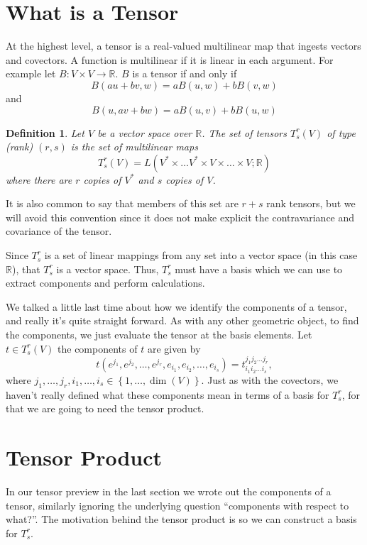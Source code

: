 \documentclass[a4paper]{article}
\newtheorem*{defn}{Definition}
\begin{document}
\section*{What is a Tensor}%
At the highest level, a tensor is a real-valued multilinear map that ingests vectors and covectors. A function is multilinear if it is linear in each argument. For example let $B: V \times V \rightarrow \mathds{R}$. $B$ is a tensor if and only if
\[
  B(au + bv, w) = aB(u,w) + bB(v,w)
\]
and
\[
  B(u, av + bw) = aB(u,v) + bB(u,w)
\]

\begin{defn}
  Let $V$ be a vector space over $\mathds{R}$. The set of tensors $T_s^r(V)$ of type (rank) $(r,s)$ is the set of multilinear maps
  \[
    T_s^r(V) = L(V^* \times \dots V^* \times V \times \dots \times V; \mathds{R})
  \]
  where there are $r$ copies of $V^*$ and $s$ copies of $V$.
\end{defn}
It is also common to say that members of this set are $r+s$ rank tensors, but we will avoid this convention since it does not make explicit the contravariance and covariance of the tensor. 

Since $T_s^r$ is a set of linear mappings from any set into a vector space (in this case $\mathds{R}$), that $T_s^r$ is a vector space. Thus, $T_s^r$ must have a basis which we can use to extract components and perform calculations. 

We talked a little last time about how we identify the components of a tensor, and really it's quite straight forward. As with any other geometric object, to find the components, we just evaluate the tensor at the basis elements. Let $t \in T_s^r(V)$ the components of $t$ are given by
\[
  t(e^{j_1}, e^{j_2}, \dots, e^{j_r}, e_{i_1}, e_{i_2}, \dots, e_{i_s}) = t^{j_1 j_2 \dots j_r}_{i_1 i_2 \dots i_s},
\]
where $j_1, \dots, j_r, i_1, \dots, i_s \in \left\{ 1, \dots, \dim(V) \right\}$.
Just as with the covectors, we haven't really defined what these components mean in terms of a basis for $T_s^r$, for that we are going to need the tensor product.

\section*{Tensor Product}%
In our tensor preview in the last section we wrote out the components of a tensor, similarly ignoring the underlying question ``components with respect to what?''. The motivation behind the tensor product is so we can construct a basis for $T_s^r$. 
\end{document}
